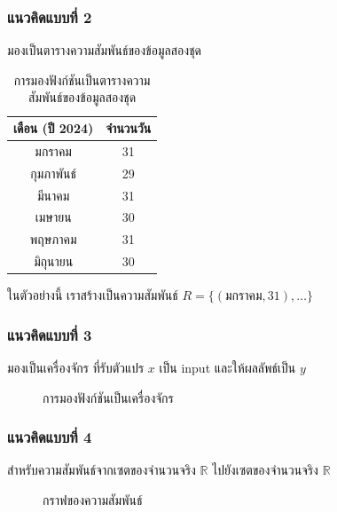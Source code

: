 \begin{frame}
\frametitle{แนวคิดแบบที่ 2}
มองเป็นตารางความสัมพันธ์ของข้อมูลสองชุด
\begin{table}[h!]
\setlength{}
\centering
\begin{tabular}{|c|c|}
\hline
เดือน (ปี 2024) & จำนวนวัน \\
\hline
มกราคม & 31 \\
กุมภาพันธ์ & 29 \\
มีนาคม & 31 \\
เมษายน & 30 \\
พฤษภาคม & 31 \\
มิถุนายน & 30 \\
\hline
\end{tabular}
\caption{การมองฟังก์ชันเป็นตารางความสัมพันธ์ของข้อมูลสองชุด}
\end{table}
\begin{slide}
ในตัวอย่างนี้ เราสร้างเป็นความสัมพันธ์ $R = \{(\text{มกราคม},31), \ldots \}$
\end{slide}
\end{frame}

\begin{frame}
\frametitle{แนวคิดแบบที่ 3}
มองเป็นเครื่องจักร ที่รับตัวแปร $x$ เป็น input และให้ผลลัพธ์เป็น $y$
\begin{figure}[h!]
\centering
{}
\caption{การมองฟังก์ชันเป็นเครื่องจักร}
\end{figure}
\end{frame}



\begin{frame}
\frametitle{แนวคิดแบบที่ 4}
สำหรับความสัมพันธ์จากเซตของจำนวนจริง $\mathbb{R}$ ไปยังเซตของจำนวนจริง $\mathbb{R}$
\begin{figure}[h!]
\centering
{}
\caption{กราฟของความสัมพันธ์}
\end{figure}
\end{frame}

